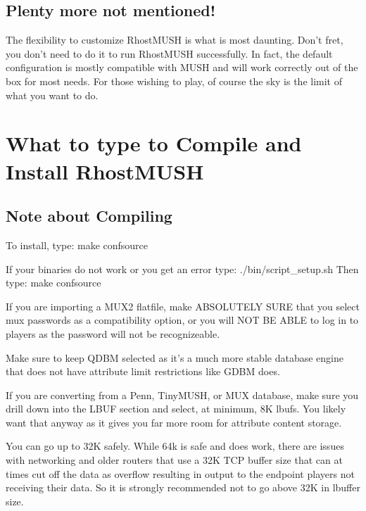 \documentclass[letterpaper,10pt,english]{sphinxmanual}
\begin{document}
\section{Plenty more not mentioned!}
\label{\detokenize{01-intro:plenty-more-not-mentioned}}
\sphinxAtStartPar
The flexibility to customize RhostMUSH is what is most daunting.
Don’t fret, you don’t need to do it to run RhostMUSH successfully.
In fact, the default configuration is mostly compatible with
MUSH and will work correctly out of the box for most needs.  For those
wishing to play, of course the sky is the limit of what you want to
do.


\chapter{What to type to Compile and Install RhostMUSH}
\label{\detokenize{02-compile:what-to-type-to-compile-and-install-rhostmush}}\label{\detokenize{02-compile::doc}}

\section{Note about Compiling}
\label{\detokenize{02-compile:note-about-compiling}}
\sphinxAtStartPar
To install, type:  make confsource

\sphinxAtStartPar
If your binaries do not work or you get an error type:  ./bin/script\_setup.sh
Then type: make confsource

\sphinxAtStartPar
If you are importing a MUX2 flatfile, make ABSOLUTELY SURE that you select
mux passwords as a compatibility option, or you will NOT BE ABLE to log in
to players as the password will not be recognizeable.

\sphinxAtStartPar
Make sure to keep QDBM selected as it’s a much more stable database engine
that does not have attribute limit restrictions like GDBM does.

\sphinxAtStartPar
If you are converting from a Penn, TinyMUSH, or MUX database, make sure you
drill down into the LBUF section and select, at minimum, 8K lbufs.  You likely
want that anyway as it gives you far more room for attribute content storage.

\sphinxAtStartPar
You can go up to 32K safely.  While 64k is safe and does work, there are issues
with networking and older routers that use a 32K TCP buffer size that can
at times cut off the data as overflow resulting in output to the end\sphinxhyphen{}point
players not receiving their data.  So it is strongly recommended not to go
above 32K in lbuffer size.
\end{document}

